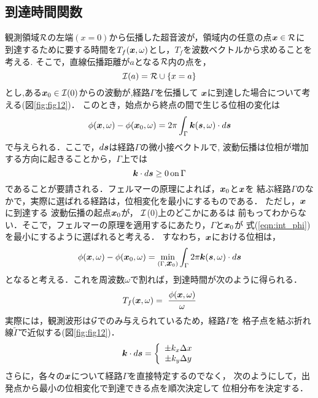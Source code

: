 \subsection{到達時間関数}
観測領域${\cal R}$の左端$(x=0)$から伝播した超音波が，領域内の任意の点$\fat{x}\in {\cal R}$に
到達するために要する時間を$T_f(\mbox{\boldmath{$x$}},\omega)$とし，$T_f$を波数ベクトルから求めることを考える.
そこで，直線伝播距離が$a$となる$\cal R$内の点を，
\begin{equation}
	{\cal I}(a)={\cal R} \cup \left\{ x=a\right\}
	\label{eqn:def_I0}
\end{equation}
とし,ある$\fat{x}_0\in {\cal I}(0)$からの波動が,経路$\Gamma$を伝播して
$\mbox{\boldmath{$x$}}$に到達した場合について考える(図\ref{fig:fig12})．
このとき，始点から終点の間で生じる位相の変化は
\begin{equation}
	\phi(\fat{x},\omega)-\phi(\fat{x}_0,\omega)=
	2\pi \int_{\Gamma} \fat{k}(\fat{s},\omega)\cdot d\fat{s}
	\label{eqn:int_phi}
\end{equation}
で与えられる．ここで，$d\mbox{\boldmath{$s$}}$は経路$\Gamma$の微小接ベクトルで, 
波動伝播は位相が増加する方向に起きることから，$\Gamma$上では
\begin{equation}
	\fat{k}\cdot d\fat{s}\geq 0 \, {\rm on} \, \Gamma 
	\label{eqn:}
\end{equation}
であることが要請される．フェルマーの原理によれば，$\mbox{\boldmath{$x$}}_0$と$\mbox{\boldmath{$x$}}$を
結ぶ経路$\Gamma$のなかで，実際に選ばれる経路は，位相変化を最小にするものである．
ただし，$\mbox{\boldmath{$x$}}$に到達する 波動伝播の起点$\mbox{\boldmath{$x$}}_0$が， $\cal I$(0)上のどこかにあるは
前もってわからない．そこで，フェルマーの原理を適用するにあたり，$\Gamma$と$\mbox{\boldmath{$x$}}_0$が
式(\ref{eqn:int_phi})を最小にするように選ばれると考える．
すなわち，$\mbox{\boldmath{$x$}}$における位相は，
\begin{equation}
	\phi(\fat{x},\omega) - \phi(\fat{x}_0,\omega)
	=
	\min_{\left(\Gamma, \fat{x}_0\right)}
	\int_\Gamma 2\pi \fat{k}(\fat{s},\omega) \cdot d\fat{s}
	\label{eqn:Fermat}
\end{equation}
となると考える．これを周波数$\omega$で割れば，到達時間が次のように得られる．
\begin{equation}
	T_f(\fat{x},\omega) = \
	\frac{\phi(\fat{x},\omega)}{\omega}
	\label{eqn:def_Tf}
\end{equation}
実際には，観測波形は${\cal G}$でのみ与えられているため，経路$\Gamma$を
格子点を結ぶ折れ線$\tilde \Gamma$で近似する(図\ref{fig:fig12})．
\begin{equation}
	\fat{k}\cdot d\fat{s}
	=
	\left\{
	\begin{array}{c}
		\pm k_x \Delta x \\
		\pm k_y \Delta y
	\end{array}
	\right.
	\label{eqn:}
\end{equation}
さらに，各々の$\mbox{\boldmath{$x$}}$について経路$\Gamma$を直接特定するのでなく，
次のようにして，出発点から最小の位相変化で到達できる点を順次決定して
位相分布を決定する．

